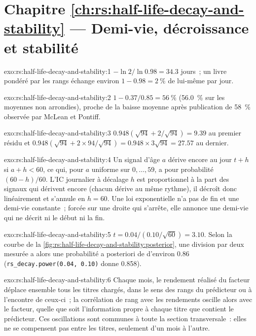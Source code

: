 \section*{Chapitre \ref{ch:rs:half-life-decay-and-stability} --- Demi-vie, décroissance et stabilité}

\begin{solution}{exo:rs:half-life-decay-and-stability:1}
$-\ln 2/\ln 0.98 = 34.3$ jours~; un livre pondéré par les rangs échange environ $1 - 0.98 = 2~\%$ de lui-même par jour.
\end{solution}

\begin{solution}{exo:rs:half-life-decay-and-stability:2}
$1 - 0.37/0.85 = 56~\%$ (56.0~\% sur les moyennes non arrondies), proche de la baisse moyenne après publication de 58~\% observée par McLean et Pontiff.
\end{solution}

\begin{solution}{exo:rs:half-life-decay-and-stability:3}
$0.948(\sqrt{94} + 2/\sqrt{94}) = 9.39$ au premier résidu et $0.948(\sqrt{94} + 2 \times 94/\sqrt{94}) = 0.948 \times 3\sqrt{94} = 27.57$
au dernier.
\end{solution}

\begin{solution}{exo:rs:half-life-decay-and-stability:4}
Un signal d'âge $a$ dérive encore au jour $t + h$ si $a + h < 60$, ce qui, pour $a$ uniforme sur $0, \dots, 59$, a pour probabilité $(60 - h)/60$. L'IC
journalier à décalage $h$ est proportionnel à la part des signaux qui dérivent encore (chacun dérive au même rythme), il décroît donc linéairement et
s'annule en $h = 60$. Une loi exponentielle n'a pas de fin et une demi-vie constante~; forcée sur une droite qui s'arrête, elle annonce une demi-vie qui
ne décrit ni le début ni la fin.
\end{solution}

\begin{solution}{exo:rs:half-life-decay-and-stability:5}
$t = 0.04/(0.10/\sqrt{60}) = 3.10$. Selon la courbe de la \cref{fig:rs:half-life-decay-and-stability:posterior}, une division par deux mesurée a alors une probabilité a posteriori de
d'environ 0.86 (\texttt{rs\_decay.power(0.04, 0.10)} donne 0.858).
\end{solution}

\begin{solution}{exo:rs:half-life-decay-and-stability:6}
Chaque mois, le rendement réalisé du facteur déplace ensemble tous les titres chargés, dans le sens des rangs du prédicteur ou à l'encontre de ceux-ci~; la corrélation
de rang avec les rendements oscille alors avec le facteur, quelle que soit l'information propre à chaque titre que contient le prédicteur. Ces oscillations sont communes à toute la
section transversale~: elles ne se compensent pas entre les titres, seulement d'un mois à l'autre.
\end{solution}

